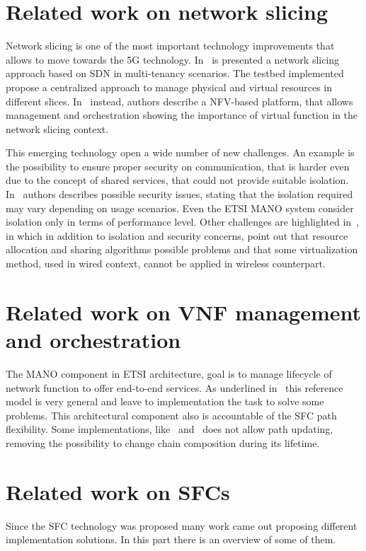 \section{Related work on network slicing}
Network slicing is one of the most important technology improvements that allows
to move towards the 5G technology. In~\cite{chartsias2017sdn} is presented a
network slicing approach based on SDN in multi-tenancy scenarios. The testbed
implemented propose a centralized approach to manage physical and virtual
resources in different slices. In~\cite{peuster2016medicine} instead, authors
describe a NFV-based platform, that allows management and orchestration showing
the importance of virtual function in the network slicing context.

This emerging technology open a wide number of new challenges. An example is the
possibility to ensure proper security on communication, that is harder even due
to the concept of shared services, that could not provide suitable isolation. 
In~\cite{kotulski2017end} authors describes possible security issues, stating
that the isolation required may vary depending on usage scenarios. Even the ETSI
MANO system consider isolation only in terms of performance level. Other
challenges are highlighted in~\cite{li2017network}, in which in addition to
isolation and security concerns, point out that resource allocation and
sharing algorithms possible problems and that some virtualization method, used
in wired context, cannot be applied in wireless counterpart.

\section{Related work on VNF management and orchestration}
The MANO component in ETSI architecture, goal is to manage lifecycle of network
function to offer end-to-end services. As underlined in~\cite{kotulski2017end}
this reference model is very general and leave to implementation the task to
solve some problems. This architectural component also is accountable of the SFC
path flexibility. Some implementations, like~\cite{soares2015toward}
and~\cite{abujoda2015midas} does not allow path updating, removing the
possibility to change chain composition during its lifetime.

\section{Related work on SFCs}

Since the SFC technology was proposed many work came out proposing different
implementation solutions. In this part there is an overview of some of them.

